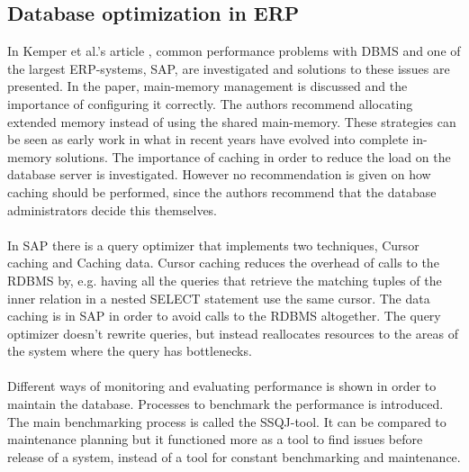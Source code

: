 \documentclass{cslthse-msc}
\begin{document}
\subsection{Database optimization in ERP}
In Kemper et al.'s article \cite{SAPR3}, common performance problems with DBMS and one of the largest ERP-systems, SAP, are investigated and solutions to these issues are presented. In the paper, main-memory management is discussed and the importance of configuring it correctly. The authors recommend allocating extended memory instead of using the shared main-memory. These strategies can be seen as early work in what in recent years have evolved into complete in-memory solutions. The importance of caching in order to reduce the load on the database server is investigated. However no recommendation is given on how caching should be performed, since the authors recommend that the database administrators decide this themselves.\\\\
In SAP there is a query optimizer that implements two techniques, Cursor caching and Caching data. Cursor caching reduces the overhead of calls to the RDBMS by, e.g. having all the queries that retrieve the matching tuples of the inner relation in a nested SELECT statement use the same cursor. The data caching is in SAP in order to avoid calls to the RDBMS altogether. The query optimizer doesn't rewrite queries, but instead reallocates resources to the areas of the system where the query has bottlenecks.\\\\
Different ways of monitoring and evaluating performance is shown in order to maintain the database. Processes to benchmark the performance is introduced. The main benchmarking process is called the SSQJ-tool. It can be compared to maintenance planning but it functioned more as a tool to find issues before release of a system, instead of a tool for constant benchmarking and maintenance.
\end{document}
